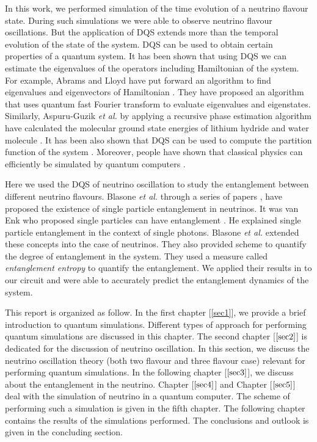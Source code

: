 \documentclass[12pt,a4paper]{report}
\begin{document}
In this work, we performed simulation of the time evolution of a neutrino flavour state. During such simulations we were able to observe neutrino flavour oscillations. But the application of DQS extends more than the temporal evolution of the state of the system. DQS can be used to obtain certain properties of a quantum system. It has been shown that using DQS we can estimate the eigenvalues of the operators including Hamiltonian of the system. For example, Abrams and Lloyd have put forward an algorithm to find eigenvalues and eigenvectors of Hamiltonian \cite{abrams}. They have proposed an algorithm that uses quantum fast Fourier transform to evaluate eigenvalues and eigenstates. Similarly, Aspuru-Guzik \emph{et al.} by applying a recursive phase estimation algorithm have calculated the molecular ground state energies of lithium hydride and water molecule \cite{aspuru}. It has been also shown that DQS can be used to compute the partition function of the system \cite{lidar}. Moreover, people have shown that classical physics can efficiently be simulated by quantum computers \cite{meyer}\cite{sinha}. 

Here we used the DQS of neutrino oscillation to study the entanglement between different neutrino flavours. Blasone \emph{et al.} through a series of papers \cite{blasone2008}\cite{blasone2009}\cite{blasone2010}\cite{blasone2014}, have proposed the existence of single particle entanglement in neutrinos. It was van Enk who proposed single particles can have entanglement \cite{vanenk2003}\cite{vanenk2005}\cite{vanenk2006}. He explained single particle entanglement in the context of single photons. Blasone \emph{et al.} extended these concepts into the case of neutrinos. They also provided scheme to quantify the degree of entanglement in the system. They used a measure called \emph{entanglement entropy} to quantify the entanglement. We applied their results in to our circuit and were able to accurately predict the entanglement dynamics of the system. 

This report is organized as follow. In the first chapter [\ref{sec1}], we provide a brief introduction to quantum simulations. Different types of approach for performing quantum simulations are discussed in this chapter. The second chapter [$\ref{sec2}$] is dedicated for the discussion of neutrino oscillation. In this section, we discuss the neutrino oscillation theory (both two flavour and three flavour case) relevant for performing quantum simulations. In the following chapter [$\ref{sec3}$], we discuss about the entanglement in the neutrino. Chapter [$\ref{sec4}$] and Chapter [$\ref{sec5}$] deal with the simulation of neutrino in a quantum computer. The scheme of performing such a simulation is given in the fifth chapter. The following chapter contains the results of the simulations performed. The conclusions and outlook is given in the concluding section.
\end{document}
